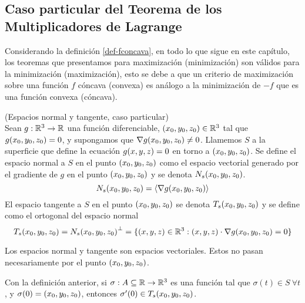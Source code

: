 \subsection{Caso particular del Teorema de los Multiplicadores de Lagrange}

\begin{nota}
Considerando la definici\'on \ref{def-fconcava}, en todo lo que sigue en este cap\'itulo, los teoremas que presentamos para maximizaci\'on (minimizaci\'on) son v\'alidos para la minimizaci\'on (maximizaci\'on), esto se debe a que un criterio de maximizaci\'on sobre una funci\'on $f$ c\'oncava (convexa) es an\'alogo a la minimizaci\'on de $-f$ que es una funci\'on convexa (c\'oncava). 
\end{nota}

\begin{definicion}{\rm (Espacios normal y tangente, caso particular)}
\\Sean $g:\mathbb{R}^3\to \mathbb{R}$ una funci\'on diferenciable, ${\p0} \in \R^3$ tal
que $g{\p0}=0$, y supongamos que $\nabla g{\p0}\neq 0$. Llamemos
$S$ a la superficie que define la ecuaci\'on $g{(x,y,z)}=0$ en torno
a $\p0$. Se define el espacio normal a $S$ en el punto $\p0$ como
el espacio vectorial generado por el gradiente de $g$ en el punto
$\p0$ y se denota $N_s{\p0}$.
\[N_s{\p0}=\langle \nabla g{\p0}\rangle\]
El espacio tangente a $S$ en el punto ${\p0}$ se denota $T_s{\p0}$
y se define como el ortogonal del espacio normal
\[T_s{\p0}=N_s{\p0}^{\perp}=\{{\pun}\in\R^3  : {\pun}\cdot\nabla g{\p0}=0\}\]
\end{definicion}

\begin{nota}
Los espacios normal y tangente son
espacios vectoriales. Estos no pasan necesariamente por el punto
$\p0$.
\end{nota}

Con la definici\'on anterior, si $\sigma:A\subseteq\mathbb{R}\to \mathbb{R}^3$
es una funci\'on tal que $\sigma(t)\in S\: \forall t$, y
$\sigma (0)={\p0}$, entonces $\sigma^{\prime}(0)\in T_s{\p0}$.

